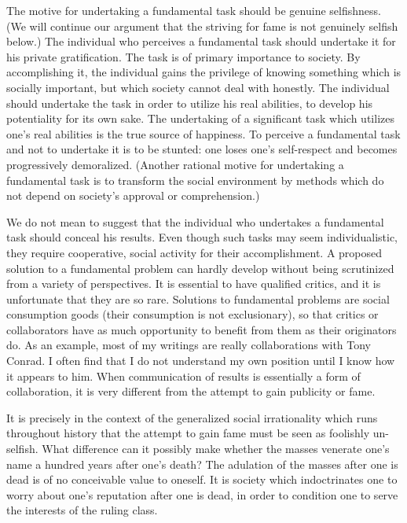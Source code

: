 \documentclass[10pt,twoside]{memoir}
\begin{document}
\begin{enumerate}
{\begin{enumerate}
\begin{sysrules}
\begin{sysrules}
\begin{sysrules}
\begin{sysrules}
{\begin{enumerate}
{{{{{{{The motive for undertaking a fundamental task should be genuine 
selfishness. (We will continue our argument that the striving for fame is not 
genuinely selfish below.) The individual who perceives a fundamental task 
should undertake it for his private gratification. The task is of primary 
importance to society. By accomplishing it, the individual gains the privilege 
of knowing something which is socially important, but which society cannot 
deal with honestly. The individual should undertake the task in order to 
utilize his real abilities, to develop his potentiality for its own sake. The 
undertaking of a significant task which utilizes one's real abilities is the true 
source of happiness. To perceive a fundamental task and not to undertake it 
is to be stunted: one loses one's self-respect and becomes progressively 
demoralized. (Another rational motive for undertaking a fundamental task is 
to transform the social environment by methods which do not depend on 
society's approval or comprehension.) 

We do not mean to suggest that the individual who undertakes a 
fundamental task should conceal his results. Even though such tasks may 
seem individualistic, they require cooperative, social activity for their 
accomplishment. A proposed solution to a fundamental problem can hardly 
develop without being scrutinized from a variety of perspectives. It is 
essential to have qualified critics, and it is unfortunate that they are so rare. 
Solutions to fundamental problems are social consumption goods (their 
consumption is not exclusionary), so that critics or collaborators have as 
much opportunity to benefit from them as their originators do. As an 
example, most of my writings are really collaborations with Tony Conrad. I 
often find that I do not understand my own position until I know how it 
appears to him. When communication of results is essentially a form of 
collaboration, it is very different from the attempt to gain publicity or fame. 

It is precisely in the context of the generalized social irrationality which 
runs throughout history that the attempt to gain fame must be seen as 
foolishly un-selfish. What difference can it possibly make whether the masses 
venerate one's name a hundred years after one's death? The adulation of the 
masses after one is dead is of no conceivable value to oneself. It is society 
which indoctrinates one to worry about one's reputation after one is dead, in 
order to condition one to serve the interests of the ruling class. 

}}}}}}}
\end{enumerate}}
\end{sysrules}
\end{sysrules}
\end{sysrules}
\end{sysrules}
\end{enumerate}}
\end{enumerate}
\end{document}
